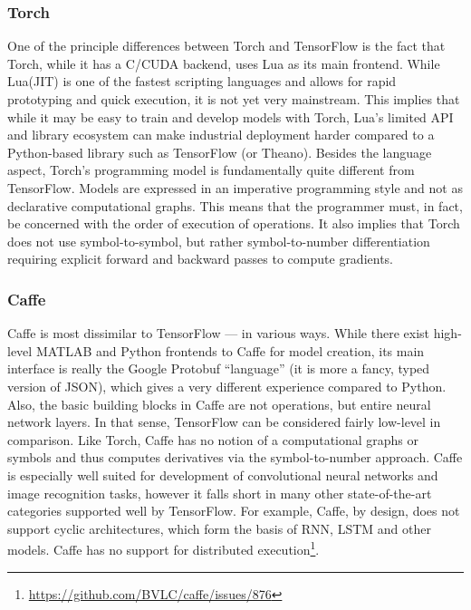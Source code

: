 \subsubsection{Torch}\label{sec:comp-quality-torch}

One of the principle differences between Torch and TensorFlow is the fact that
Torch, while it has a C/CUDA backend, uses Lua as its main frontend. While
Lua(JIT) is one of the fastest scripting languages and allows for rapid
prototyping and quick execution, it is not yet very mainstream. This implies
that while it may be easy to train and develop models with Torch, Lua's limited
API and library ecosystem can make industrial deployment harder compared to a
Python-based library such as TensorFlow (or Theano). Besides the language
aspect, Torch's programming model is fundamentally quite different from
TensorFlow. Models are expressed in an imperative programming style and not as
declarative computational graphs. This means that the programmer must, in fact,
be concerned with the order of execution of operations. It also implies that
Torch does not use symbol-to-symbol, but rather symbol-to-number differentiation
requiring explicit forward and backward passes to compute gradients.

\subsubsection{Caffe}\label{sec:comp-quality-caffe}

Caffe is most dissimilar to TensorFlow --- in various ways. While there exist
high-level MATLAB and Python frontends to Caffe for model creation, its main
interface is really the Google Protobuf ``language'' (it is more a fancy, typed
version of JSON), which gives a very different experience compared to
Python. Also, the basic building blocks in Caffe are not operations, but entire
neural network layers. In that sense, TensorFlow can be considered fairly
low-level in comparison. Like Torch, Caffe has no notion of a computational
graphs or symbols and thus computes derivatives via the symbol-to-number
approach. Caffe is especially well suited for development of convolutional
neural networks and image recognition tasks, however it falls short in many
other state-of-the-art categories supported well by TensorFlow. For example,
Caffe, by design, does not support cyclic architectures, which form the basis of
RNN, LSTM and other models. Caffe has no support for distributed
execution\footnote{\url{https://github.com/BVLC/caffe/issues/876}}.

